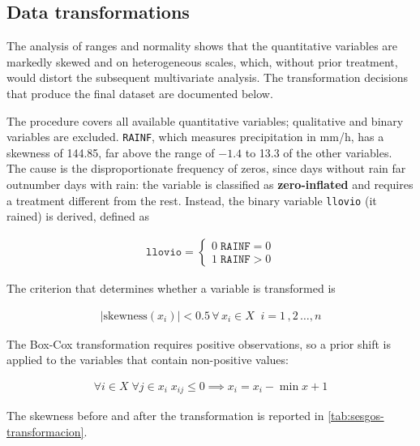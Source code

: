 \subsection{Data transformations}\label{sec:transformaciones}

The analysis of ranges and normality shows that the quantitative variables
are markedly skewed and on heterogeneous scales, which, without prior
treatment, would distort the subsequent multivariate analysis. The
transformation decisions that produce the final dataset are documented
below.

The procedure covers all available quantitative variables; qualitative and
binary variables are excluded. \texttt{RAINF}, which measures precipitation
in mm/h, has a skewness of 144.85, far above the range of $-1.4$ to 13.3 of
the other variables. The cause is the disproportionate frequency of zeros,
since days without rain far outnumber days with rain: the variable is
classified as \textbf{zero-inflated} and requires a treatment different from
the rest. Instead, the binary variable \texttt{llovio} (it rained) is
derived, defined as

\begin{align}
     \texttt{llovio}=\begin{cases}
        0\;\texttt{RAINF} = 0\\
        1\;\texttt{RAINF} > 0
    \end{cases}
\end{align}

The criterion that determines whether a variable is transformed is

\begin{align}
    |\text{skewness}(x_i)|<0.5\,\forall\, x_i\in X\;\;i=1\,,2\,\dots,n
\end{align}

The Box-Cox transformation requires positive observations, so a prior shift
is applied to the variables that contain non-positive values:

\begin{align}
    \forall i\in X\;\forall j\in x_i\;x_{ij} \leq0 \implies x_i = x_i - \min{x} + 1
\end{align}

The skewness before and after the transformation is reported in
\cref{tab:sesgos-transformacion}.


